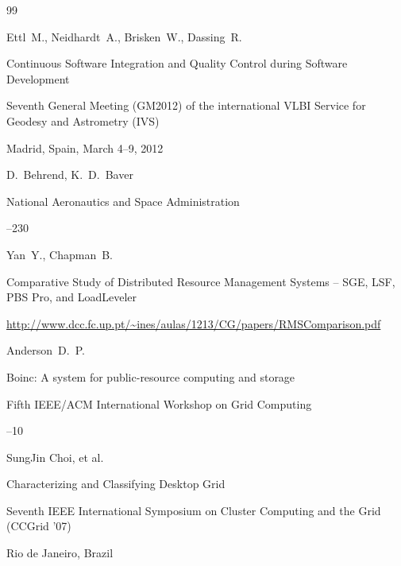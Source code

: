 \begin{thebibliography}{99}

\by Ettl~M., Neidhardt~A., Brisken~W., Dassing~R.

\paper Continuous Software   Integration and Quality Control during Software Development

\inbook Seventh General Meeting (GM2012) of the international VLBI Service for Geodesy and Astrometry (IVS)

\procinfo Madrid, Spain, March 4--9, 2012

  \eds D.~Behrend, K.~D.~Baver

\publaddr National Aeronautics and Space Administration


--230






\by Yan~Y., Chapman~B.

\preprint Comparative Study of Distributed Resource Management Systems – SGE, LSF, PBS Pro, and LoadLeveler

\elink \url{http://www.dcc.fc.up.pt/~ines/aulas/1213/CG/papers/RMSComparison.pdf}






\by Anderson~D.~P.

\paper Boinc: A system for public-resource computing and   storage


\inbook  Fifth IEEE/ACM International Workshop on Grid Computing


--10






\by SungJin Choi, et al.


\paper Characterizing and  Classifying Desktop Grid

\inbook Seventh IEEE International Symposium on Cluster Computing and the Grid (CCGrid '07)

\publaddr Rio de Janeiro, Brazil



\end{thebibliography}
